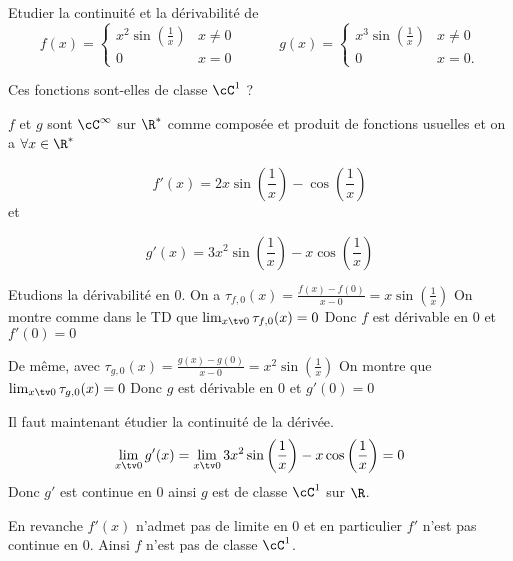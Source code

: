 



\begin{exercice}   \;
Etudier la continuité et la dérivabilité de 
$$f(x)=\left\{\begin{array}{ll}
x^2\sin\left(\frac 1x\right)&x\neq 0\\
0&x=0
\end{array}\right.\quad\quad\quad
g(x)=\left\{\begin{array}{ll}
x^3\sin\left(\frac 1x\right)&x\neq 0\\
0&x=0.
\end{array}\right.$$

Ces fonctions sont-elles de classe $\cC^1$ ? 
\end{exercice}

\begin{correction}

$f$ et $g$ sont $\cC^\infty$ sur $\R^*$ comme composée et produit de fonctions usuelles et on a $\forall x\in \R^*$

$$f'(x) = 2x \sin\left(\frac 1x\right) -\cos\left(\frac 1x\right)$$
et 

$$g'(x) = 3x^2 \sin\left(\frac 1x\right) -x\cos\left(\frac 1x\right)$$


Etudions la dérivabilité en $0$. 
On  a $\tau_{f,0} (x)=\frac{f(x)-f(0)}{x-0}= x\sin\left(\frac 1x\right)$ 
On montre comme dans le TD que $\lim_{x\tv0}\tau_{f,0} (x) =0$
Donc $f$ est dérivable en $0$ et $f'(0)=0$

De même, avec 
$\tau_{g,0} (x)=\frac{g(x)-g(0)}{x-0}= x^2\sin\left(\frac 1x\right)$ 
On montre que $\lim_{x\tv0}\tau_{g,0} (x) =0$
Donc $g$ est dérivable en $0$ et $g'(0)=0$


Il faut maintenant étudier la continuité de  la dérivée. 
$$\lim_{x\tv 0} g'(x) = \lim_{x\tv 0}  3x^2 \sin\left(\frac 1x\right) -x\cos\left(\frac 1x\right) = 0$$
Donc $g'$ est continue en $0$  ainsi $g$ est de classe $\cC^1$ sur $\R$. 

En revanche $f'(x) $ n'admet pas de limite en $0$ et en particulier $f'$ n'est pas continue en $0$. Ainsi $f$ n'est  pas de classe $\cC^1$. 

\end{correction}
